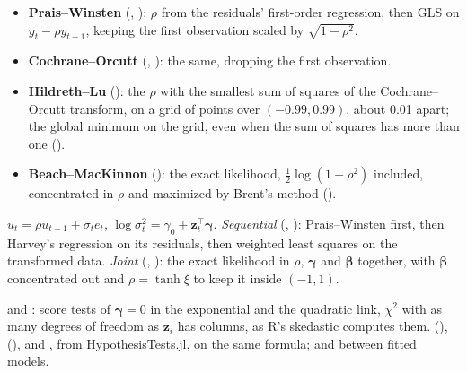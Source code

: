\begin{itemize}
  \item \textbf{Prais--Winsten} (, ): $\rho$ from the
    residuals' first-order regression, then GLS on $y_t - \rho y_{t-1}$, keeping the first observation scaled by
    $\sqrt{1-\rho^2}$.
  \item \textbf{Cochrane--Orcutt} (, ): the same,
    dropping the first observation.
  \item \textbf{Hildreth--Lu} (): the $\rho$ with the smallest sum of squares of the Cochrane--Orcutt
    transform, on a grid of  points over $(-0.99, 0.99)$, about 0.01 apart; the global minimum on the
    grid, even when the sum of squares has more than one ().
  \item \textbf{Beach--MacKinnon} (): the exact likelihood, $\frac12\log(1-\rho^2)$ included,
    concentrated in $\rho$ and maximized by Brent's method ().
\end{itemize}

$u_t = \rho u_{t-1} + \sigma_t e_t$, $\log\sigma_t^2 = \gamma_0 + \mathbf{z}_t^\top\boldsymbol\gamma$.
\emph{Sequential} (, ): Prais--Winsten first, then Harvey's
regression on its residuals, then weighted least squares on the transformed data. \emph{Joint}
(, ): the exact likelihood in $\rho$, $\boldsymbol\gamma$ and
$\boldsymbol\beta$ together, with $\boldsymbol\beta$ concentrated out and $\rho = \tanh\xi$ to keep it inside
$(-1, 1)$.

 and : score tests of $\boldsymbol\gamma = 0$ in the exponential and the quadratic
link, $\chi^2$ with as many degrees of freedom as $\mathbf{z}_i$ has columns, as R's skedastic computes them.
 (), 
(),  and , from
HypothesisTests.jl, on the same formula;  and  between fitted models.


